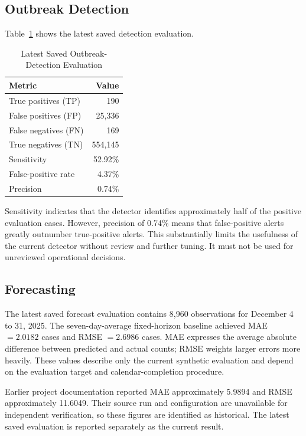 \documentclass[conference]{IEEEtran}
\begin{document}
\subsection{Outbreak Detection}

Table~\ref{tab:detection} shows the latest saved detection evaluation.

\begin{table}[!t]
\caption{Latest Saved Outbreak-Detection Evaluation}
\label{tab:detection}
\centering
\begin{tabular}{lr}
\toprule
Metric & Value \\
\midrule
True positives (TP) & 190 \\
False positives (FP) & 25,336 \\
False negatives (FN) & 169 \\
True negatives (TN) & 554,145 \\
Sensitivity & 52.92\% \\
False-positive rate & 4.37\% \\
Precision & 0.74\% \\
\bottomrule
\end{tabular}
\end{table}

Sensitivity indicates that the detector identifies approximately half of the positive evaluation cases. However, precision of 0.74\% means that false-positive alerts greatly outnumber true-positive alerts. This substantially limits the usefulness of the current detector without review and further tuning. It must not be used for unreviewed operational decisions.

\subsection{Forecasting}

The latest saved forecast evaluation contains 8,960 observations for December 4 to 31, 2025. The seven-day-average fixed-horizon baseline achieved MAE \(=2.0182\) cases and RMSE \(=2.6986\) cases. MAE expresses the average absolute difference between predicted and actual counts; RMSE weights larger errors more heavily. These values describe only the current synthetic evaluation and depend on the evaluation target and calendar-completion procedure.

Earlier project documentation reported MAE approximately 5.9894 and RMSE approximately 11.6049. Their source run and configuration are unavailable for independent verification, so these figures are identified as historical. The latest saved evaluation is reported separately as the current result.
\end{document}
